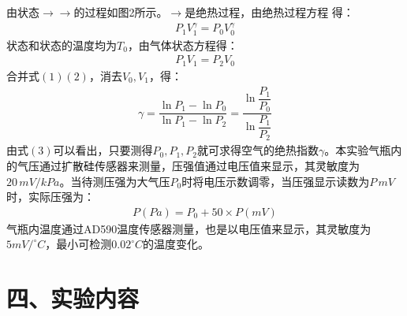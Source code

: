 \documentclass[11pt]{article}
\begin{document}
由状态\uppercase\expandafter{}$\rightarrow $\uppercase\expandafter{}$\rightarrow $\uppercase\expandafter{}的过程如图2所示。\uppercase\expandafter{}$\rightarrow $\uppercase\expandafter{}是绝热过程，由绝热过程方程
得：
\begin{align}
    P_1V_1^\gamma=P_0V_0^\gamma
\end{align}
状态\uppercase\expandafter{}和状态\uppercase\expandafter{}的温度均为$T_0$，由气体状态方程得：
\begin{align}
    P_1V_1=P_2V_0
\end{align}
合并式$(1)(2)$，消去$V_0,V_1$，得：
\begin{align}
    \gamma=\dfrac{\ln{P_1}-\ln{P_0}}{\ln{P_1}-\ln{P_2}}=\dfrac{\ln{\dfrac{P_1}{P_0}}}{\ln{\dfrac{P_1}{P_2}}}
\end{align}
由式$(3)$可以看出，只要测得$P_0,P_1,P_2$就可求得空气的绝热指数$\gamma$。本实验气瓶内的气压通过扩散硅传感器来测量，压强值通过电压值来显示，其灵敏度为$20\,mV/kPa$。当待测压强为大气压$P_0$时将电压示数调零，当压强显示读数为$P\,mV$时，实际压强为：
\begin{align}
    P(Pa)=P_0+50\times P(mV)
\end{align}
气瓶内温度通过AD590温度传感器测量，也是以电压值来显示，其灵敏度为$5mV/^{\circ}C$，最小可检测$0.02^{\circ}C$的温度变化。

\section*{四、实验内容}
\end{document}
